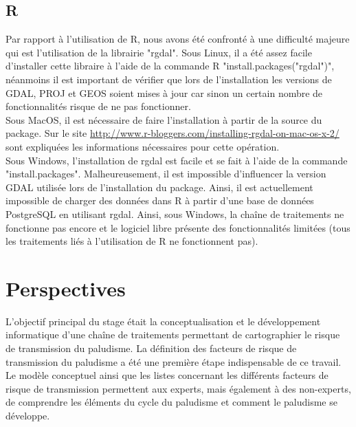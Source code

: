 \subsection{R}

Par rapport à l'utilisation de R, nous avons été confronté à une difficulté majeure qui est l'utilisation de la librairie "rgdal". Sous Linux, il a été assez facile d'installer cette libraire à l'aide de la commande R "install.packages("rgdal")", néanmoins il est important de vérifier que lors de l'installation les versions de GDAL, PROJ et GEOS soient mises à jour car sinon un certain nombre de fonctionnalités risque de ne pas fonctionner. \\

Sous MacOS, il est nécessaire de faire l'installation à partir de la  source du package. Sur le site \url{http://www.r-bloggers.com/installing-rgdal-on-mac-os-x-2/} sont expliquées les informations nécessaires pour cette opération.\\

Sous Windows, l'installation de rgdal est facile et se fait à l'aide de la commande "install.packages". Malheureusement, il est impossible d'influencer la version GDAL utilisée lors de l'installation du package. Ainsi, il est actuellement impossible de charger des données dans R à partir d'une base de données PostgreSQL en utilisant rgdal. Ainsi, sous Windows, la chaîne de traitements ne fonctionne pas encore et le logiciel libre présente des fonctionnalités limitées (tous les traitements liés à l'utilisation de R ne fonctionnent pas).\\


\section{Perspectives}

L'objectif principal du stage était la conceptualisation et le développement informatique d'une chaîne de traitements permettant de cartographier le risque de transmission du paludisme. La définition des facteurs de risque de transmission du paludisme a été une première étape indispensable de ce travail.\\

Le modèle conceptuel ainsi que les listes concernant les différents facteurs de risque de transmission permettent aux experts, mais également à des non-experts, de comprendre les éléments  du cycle du paludisme et comment le paludisme se développe.\\

